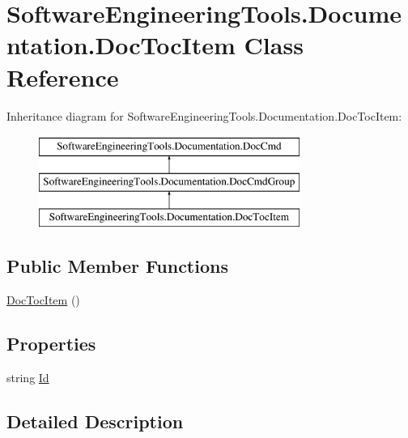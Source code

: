 \hypertarget{class_software_engineering_tools_1_1_documentation_1_1_doc_toc_item}{\section{Software\+Engineering\+Tools.\+Documentation.\+Doc\+Toc\+Item Class Reference}
\label{class_software_engineering_tools_1_1_documentation_1_1_doc_toc_item}
}
Inheritance diagram for Software\+Engineering\+Tools.\+Documentation.\+Doc\+Toc\+Item\+:\begin{figure}[H]
\begin{center}
\leavevmode
\includegraphics[height=3.000000cm]{class_software_engineering_tools_1_1_documentation_1_1_doc_toc_item}
\end{center}
\end{figure}
\subsection*{Public Member Functions}
\begin{DoxyCompactItemize}
\item 
\hyperlink{class_software_engineering_tools_1_1_documentation_1_1_doc_toc_item_abb7ea48ea2672db86dc03668ed5339fc}{Doc\+Toc\+Item} ()
\end{DoxyCompactItemize}
\subsection*{Properties}
\begin{DoxyCompactItemize}
\item 
string \hyperlink{class_software_engineering_tools_1_1_documentation_1_1_doc_toc_item_a141823f142882df4ad7cd66eefbf834e}{Id}
\end{DoxyCompactItemize}


\subsection{Detailed Description}


